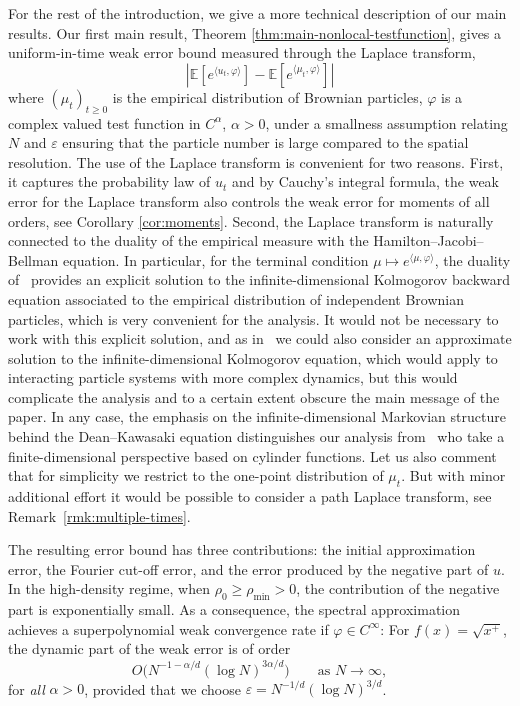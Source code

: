 \documentclass[a4paper,12pt]{article}
\newcommand{\E}{\mathbb{E}}
\begin{document}
For the rest of the introduction, we give a more technical description of our main results. Our first main result, Theorem \ref{thm:main-nonlocal-testfunction}, gives a uniform-in-time weak error bound measured through the Laplace transform,
\[
|\E [e^{\langle u_t, \varphi \rangle}] - \E [e^{\langle \mu_t, \varphi \rangle}] | 
\]
where  $(\mu_t)_{t \ge 0}$ is the empirical distribution of Brownian particles, $\varphi$ is a complex valued test function in $C^{\alpha}$, $\alpha >0$, under a smallness assumption relating $N$ and $\varepsilon$ ensuring that the particle number is large compared to the spatial resolution. The use of the Laplace transform is convenient for two reasons. First, it captures the probability law of $u_t$ and by Cauchy's integral formula, the weak error for the Laplace transform also controls the weak error for moments of all orders, see Corollary \ref{cor:moments}. Second, the Laplace transform is naturally connected to the duality of the empirical measure with the Hamilton--Jacobi--Bellman equation. In particular, for the terminal condition $\mu\mapsto e^{\langle \mu, \varphi\rangle}$, the duality of~\cite{Konarovskyi2019} provides an explicit solution to the infinite-dimensional Kolmogorov backward equation associated to the empirical distribution of independent Brownian particles, which is very convenient for the analysis. It would not be necessary to work with this explicit solution, and as in~\cite{Djurdjevac2026} we could also consider an approximate solution to the infinite-dimensional Kolmogorov equation, which would apply to interacting particle systems with more complex dynamics, but this would complicate the analysis and to a certain extent obscure the main message of the paper. In any case, the emphasis on the infinite-dimensional Markovian structure behind the Dean--Kawasaki equation distinguishes our analysis from~\cite{Cornalba2023, Cornalba2023Density} who take a finite-dimensional perspective based on cylinder functions. Let us also comment that for simplicity we restrict to the one-point distribution of $\mu_t$. But with minor additional effort it would be possible to consider a path Laplace transform, see Remark~\ref{rmk:multiple-times}.



The resulting error bound has three contributions: the initial approximation error, the Fourier cut-off error, and the error produced by the negative part of $u$.  In the high-density regime, when $\rho_0 \geq \rho_{\min}>0$, the contribution of the negative part is exponentially small. As a consequence, the spectral approximation achieves a superpolynomial weak convergence rate if $\varphi \in C^\infty$: For $f(x)=\sqrt{x^+}$, the dynamic part of the weak error is of order
\begin{equation}\label{eq:bound-high-density}
  O\!\bigl(N^{-1-\alpha/d}(\log N)^{3\alpha/d}\bigr)
  \qquad\text{as }N\to\infty,
\end{equation}
for \emph{all} $\alpha>0$, provided that we choose $\varepsilon=N^{-1/d}(\log N)^{3/d}$.
\end{document}

